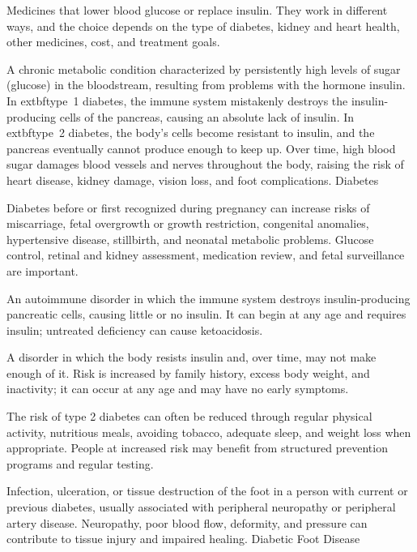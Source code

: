  Medicines that lower blood glucose or replace insulin. They work in different ways, and the choice depends on the type of diabetes, kidney and heart health, other medicines, cost, and treatment goals.

 A chronic metabolic condition characterized by persistently high levels of sugar (glucose) in the bloodstream, resulting from problems with the hormone insulin. In  extbf{type~1 diabetes}, the immune system mistakenly destroys the insulin-producing cells of the pancreas, causing an absolute lack of insulin. In  extbf{type~2 diabetes}, the body's cells become resistant to insulin, and the pancreas eventually cannot produce enough to keep up. Over time, high blood sugar damages blood vessels and nerves throughout the body, raising the risk of heart disease, kidney damage, vision loss, and foot complications.
\synonyms
Diabetes

 Diabetes before or first recognized during pregnancy can increase risks of miscarriage, fetal overgrowth or growth restriction, congenital anomalies, hypertensive disease, stillbirth, and neonatal metabolic problems. Glucose control, retinal and kidney assessment, medication review, and fetal surveillance are important.

 An autoimmune disorder in which the immune system destroys insulin-producing pancreatic cells, causing little or no insulin. It can begin at any age and requires insulin; untreated deficiency can cause ketoacidosis.

 A disorder in which the body resists insulin and, over time, may not make enough of it. Risk is increased by family history, excess body weight, and inactivity; it can occur at any age and may have no early symptoms.

 The risk of type 2 diabetes can often be reduced through regular physical activity, nutritious meals, avoiding tobacco, adequate sleep, and weight loss when appropriate. People at increased risk may benefit from structured prevention programs and regular testing.

 Infection, ulceration, or tissue destruction of the foot in a person
with current or previous diabetes, usually associated with peripheral neuropathy or
peripheral artery disease. Neuropathy, poor blood flow, deformity, and pressure can
contribute to tissue injury and impaired healing.
\synonyms
Diabetic Foot Disease

